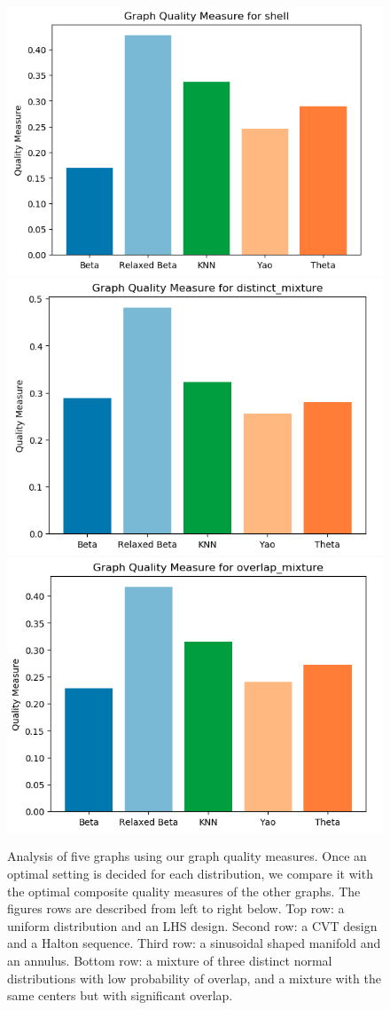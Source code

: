 \begin{figure}[htbp]
    \includegraphics[width=0.45\linewidth]{figs/chap7/shell_quality.png}
    \includegraphics[width=0.45\linewidth]{figs/chap7/distinct_quality.png}
    \includegraphics[width=0.45\linewidth]{figs/chap7/overlap_quality.png}
    \caption[Two-dimensional optimal graph quality results]{Analysis of five graphs using our graph quality measures.
    Once an optimal setting is decided for each distribution, we compare it with the optimal composite quality measures of the other graphs.
    The figures rows are described from left to right below.
    Top row: a uniform distribution and an LHS design.
    Second row: a CVT design and a Halton sequence.
    Third row: a sinusoidal shaped manifold and an annulus.
    Bottom row: a mixture of three distinct normal distributions with low probability of overlap, and a mixture with the same centers but with significant overlap.}
    \label{fig:graph_quality}
\end{figure}

